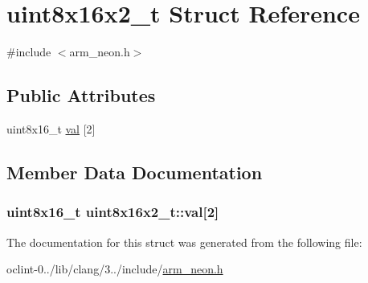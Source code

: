 \hypertarget{structuint8x16x2__t}{\section{uint8x16x2\-\_\-t Struct Reference}
\label{structuint8x16x2__t}
}


{\ttfamily \#include $<$arm\-\_\-neon.\-h$>$}

\subsection*{Public Attributes}
\begin{DoxyCompactItemize}
\item 
uint8x16\-\_\-t \hyperlink{structuint8x16x2__t_a94ba576d8133698da63185222062503a}{val} \mbox{[}2\mbox{]}
\end{DoxyCompactItemize}


\subsection{Member Data Documentation}
\hypertarget{structuint8x16x2__t_a94ba576d8133698da63185222062503a}{
\subsubsection[{val}]{\setlength{\rightskip}{0pt plus 5cm}uint8x16\-\_\-t uint8x16x2\-\_\-t\-::val\mbox{[}2\mbox{]}}}\label{structuint8x16x2__t_a94ba576d8133698da63185222062503a}


The documentation for this struct was generated from the following file\-:\begin{DoxyCompactItemize}
\item 
oclint-\/0../lib/clang/3../include/\hyperlink{arm__neon_8h}{arm\-\_\-neon.\-h}\end{DoxyCompactItemize}
